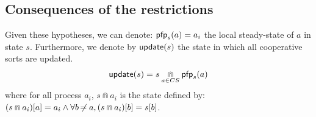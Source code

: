\begin{comment}
\begin{corollary}
\label{co:totalss}
  $\forall a \in \PHs, \forall s \in \restriction{\PHl}{\Vs(a)}, \exists \delta \in \restriction{\Sce}{\Vh(a)}$, no action of $\Vh(a)$ can be played in $s \PHplay \delta$.
\end{corollary}



\pref{th:autohits} states that any sequence $\zeta$ of self-actions can be played eventually.
\begin{theorem}
\label{th:autohits}
  Let $a \in \PHs$, $s \in \PHl$ and $\zeta \in \BS(a)$, with $n = |\indexes{\zeta}|$ so that $\forall i \in \segm{1}{n}, \PHsort(\PHhitter(\zeta_i)) = a$.
  $\exists (\delta_i)_{i \in \segm{1}{n}} \in \Sce$ so that $\forall i \in \segm{1}{n}$, $\zeta_i$ can be played in $s \PHplay \delta_1 \PHplay \zeta_1 \PHplay \dots \PHplay \delta_i$. 
\end{theorem}

\begin{proof}
  With \pref{co:vplay} applied iteratively.
\end{proof}

\towrite{Théorème nécessaire pour la suite: une séquence d'actions dans $\BS(a)$ peut être jouée si précédée ou entrelacée par des $\zeta$ (?)}
\end{comment}

\subsection{Consequences of the restrictions}
Given these hypotheses, we can denote: $\mathsf{pfp}_s(a) = a_i$ the local steady-state of $a$ in state $s$.
Furthermore, we denote by $\mathsf{update}(s)$ the state in which all cooperative sorts are updated.
\begin{align*}
  \mathsf{update}(s) = s \underset{a \in CS}{\Cap } \mathsf{pfp}_{s}(a)
\end{align*}
where for all process $a_i$, $s \Cap a_i$ is the state defined by:
${(s \Cap a_i)[a]} = a_i \wedge \forall b \not\nobreak\mkern -2mu = a, {(s \Cap a_i)[b]} = {s[b]}$.

